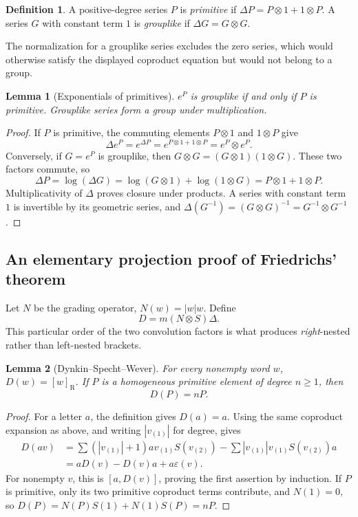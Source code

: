 \documentclass[11pt]{article}
\numberwithin{equation}{section}
\newtheorem{lemma}[lemma]{Lemma}
\theoremstyle{definition}
\newtheorem{definition}[definition]{Definition}
\theoremstyle{remark}
\newcommand{\eps}{\varepsilon}
\newcommand{\RB}[1]{[#1]_{\mathrm R}}
\begin{document}
\begin{definition}
A positive-degree series $P$ is \emph{primitive} if
$\Delta P=P\otimes1+1\otimes P$. A series $G$ with constant term $1$ is
\emph{grouplike} if $\Delta G=G\otimes G$.
\end{definition}
The normalization for a grouplike series excludes the zero series, which
would otherwise satisfy the displayed coproduct equation but would not
belong to a group.

\begin{lemma}[Exponentials of primitives]\label{lem:grouplike}
$e^P$ is grouplike if and only if $P$ is primitive. Grouplike series form
a group under multiplication.
\end{lemma}
\begin{proof}
If $P$ is primitive, the commuting elements $P\otimes1$ and $1\otimes P$
give
\[
 \Delta e^P=e^{\Delta P}=e^{P\otimes1+1\otimes P}=e^P\otimes e^P.
\]
Conversely, if $G=e^P$ is grouplike, then
$G\otimes G=(G\otimes1)(1\otimes G)$. These two factors commute, so
\[
 \Delta P=\log(\Delta G)
 =\log(G\otimes1)+\log(1\otimes G)=P\otimes1+1\otimes P.
\]
Multiplicativity of $\Delta$ proves closure under products. A series
with constant term $1$ is invertible by its geometric series, and
$\Delta(G^{-1})=(G\otimes G)^{-1}=G^{-1}\otimes G^{-1}$.
\end{proof}

\subsection{An elementary projection proof of Friedrichs' theorem}
Let $N$ be the grading operator, $N(w)=|w|w$. Define
\begin{equation}\label{eq:dynkinoperator}
 D=m(N\otimes S)\Delta.
\end{equation}
This particular order of the two convolution factors is what produces
\emph{right}-nested rather than left-nested brackets.

\begin{lemma}[Dynkin--Specht--Wever]\label{lem:dsw}
For every nonempty word $w$, $D(w)=\RB{w}$. If $P$ is a homogeneous
primitive element of degree $n\geq1$, then
\begin{equation}\label{eq:dswprimitive}
 D(P)=nP.
\end{equation}
\end{lemma}
\begin{proof}
For a letter $a$, the definition gives $D(a)=a$. Using the same
coproduct expansion as above, and writing $|v_{(1)}|$ for degree, gives
\begin{align*}
 D(av)
 &=\sum (|v_{(1)}|+1)a v_{(1)}S(v_{(2)})
   -\sum |v_{(1)}|v_{(1)}S(v_{(2)})a\\
 &=aD(v)-D(v)a+a\eps(v).
\end{align*}
For nonempty $v$, this is $[a,D(v)]$, proving the first assertion by
induction. If $P$ is primitive, only its two primitive coproduct terms
contribute, and $N(1)=0$, so
$D(P)=N(P)S(1)+N(1)S(P)=nP$.
\end{proof}
\end{document}
